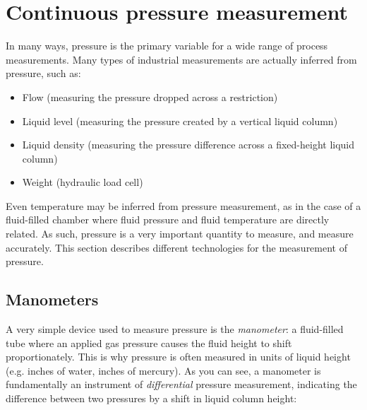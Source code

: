 
\chapter{Continuous pressure measurement}

In many ways, pressure is the primary variable for a wide range of process measurements.  Many types of industrial measurements are actually inferred from pressure, such as:  

\begin{itemize}
\item Flow (measuring the pressure dropped across a restriction)
\item Liquid level (measuring the pressure created by a vertical liquid column)
\item Liquid density (measuring the pressure difference across a fixed-height liquid column)
\item Weight (hydraulic load cell)
\end{itemize}

Even temperature may be inferred from pressure measurement, as in the case of a fluid-filled chamber where fluid pressure and fluid temperature are directly related.  As such, pressure is a very important quantity to measure, and measure accurately.  This section describes different technologies for the measurement of pressure.  






\filbreak
\section{Manometers}

A very simple device used to measure pressure is the \textit{manometer}: a fluid-filled tube where an applied gas pressure causes the fluid height to shift proportionately.  This is why pressure is often measured in units of liquid height (e.g. inches of water, inches of mercury).  As you can see, a manometer is fundamentally an instrument of \textit{differential} pressure measurement, indicating the difference between two pressures by a shift in liquid column height: 

